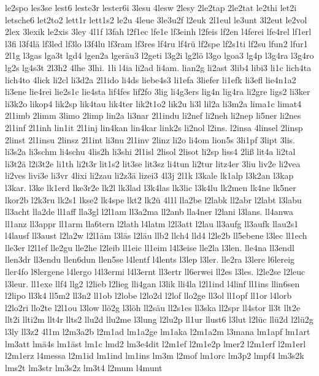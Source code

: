 {le2spo
les3se
lest6
leste3r
lester6i
3lesu
4lesw
2lesy
2le2tap
2le2tat
le2thi
let2i
letsche6
let2to2
lett1r
lett1s2
le2u
4leue
3le3u2f
l2euk
2l1eul
le3unt
3l2eut
le2vol
2lex
3lexik
le2xis
3ley
4l1f
l3fah
l2f1ec
lfe1e
lf3einh
l2feis
lf2en
l4ferei
lfe4rel
lf1erl
l3fi
l3f4lä
lf3led
lf3lo
l3f4lu
lf3ram
lf3res
lf4ru
lf4rü
lf2spe
lf2s1ti
lf2su
lfun2
lfur1
2l1g
l3gas
lga3t
lgd4
lgen2a
lgeräu3
l2geti
l3g2i
lg2lö
l3go
lgoa3
lg4p
l3g4ra
l3g4ro
lg2s
lg4s3t
2l3h2
4lhe
3lhi.
1li
l4ia
li2ad
li4am.
lian2g
li2ast
3lib4
libi3
li1c
lich4ta
lich4to
4lick
li2cl
li3d2a
2l1ido
li4ds
liebe4s3
li1efa
3liefer
li1efk
li3efl
lie4n1a2
li3ene
lie4rei
lie2s1c
lie4sta
lif4fes
lif2fo
3lig
li4g3ers
lig4n
lig4ra
li2gre
ligs2
li3ker
li3k2o
likop4
lik2sp
lik4tau
lik4ter
lik2t1o2
lik2u
li3l
lil2a
li3m2a
lima1c
limat4
2l1imb
2limm
3limo
2limp
lin2a
li3nar
2l1indu
li2nef
li2neh
li2nep
li5ner
li2nes
2l1inf
2l1inh
lin1it
2l1inj
lin4kan
lin4kar
link2s
li2nol
l2ins.
l2insa
4linsel
2linsp
2linst
2l1insu
2linsz
2l1int
li3nu
2l1inv
2linz
li2o
li4om
lion5s
3li1pf
3lipt
3lis.
li3s2a
li3schm
li4schu
4lis2h
li3shi
2l1isl
2lisol
2lisot
li2sp
liss4
2liß
lit4a
li2tal
li3t2ä
l2i3t2e
li1th
li2t3r
lit1s2
lit3se
lit3sz
li4tun
li2tur
litz4er
3liu
liv2e
li2vea
li2ves
livi3e
li3vr
4lixi
li2zau
li2z3ä
lizei3
4l3j
2l1k
l3kale
lk1alp
l3k2an
l3kap
l3kar.
l3ke
lk1erd
lke3r2e
lk2l
lk3lad
l3k4las
lk3lic
l3k4lu
lk2men
lk4ne
lk5ner
lkor2b
l2k3ru
lk2s1
lkse2
lk4spe
lkt2
lk2ü
4l1l
lla2be
l2labk
ll2abr
l2labt
l3labu
ll3acht
lla2de
ll1aff
lla3gl
l2l1am
ll3a2ma
ll2anb
lla4ner
l2lani
l3lans.
ll4anwa
ll1anz
ll3appr
ll1arm
lla6tern
l2lath
l4latm
l2l3att
l2lau
ll3aufg
ll3aufk
llau2s1
l4lausf
ll3aust
l2la2w
l2l1äm
l3läs
l2läu
llb2
llch4
lld4
l2le2b
ll5ebene
l3lec
ll1ech
lle3er
l2l1ef
lle2gu
lle2he
l2leib
ll1eic
ll1eim
l4l3eise
lle2la
l3len.
lle4na
ll3endl
llen3dr
ll3endu
llen6dun
llen5se
l4lentf
l4lents
l3lep
l3ler.
lle2ra
l3lere
l6lereig
ller4fo
l8lergene
l4lergo
l4l3ermi
l4l3ernt
ll3ertr
ll6erwei
ll2es
l3les.
l2le2se
l2leuc
l3leur.
ll1exe
llf4
llg2
l2lieb
l2lieg
lli4gan
l3lik
lli4la
l2l1ind
l4linf
ll1ins
llin6sen
l2lipo
ll3k4
ll5m2
ll3n2
ll1ob
l2lobe
l2lo2d
l2lof
llo2ge
ll3ol
ll1opf
ll1or
l4lorb
l2lo2ri
llo2te
l2l1ou
l3low
llö2g
l3löh
ll2säu
ll2s1es
ll3ska
ll2spr
ll4stor
ll3t
llt2e
llt2i
llti2m
llt4r
llts2
llu2d
llu2me
l3lung
l2lu2p
ll1ur
llust6
l3lut
l2lüc
llü2d
l2lü2g
l3ly
ll3z2
4l1m
l2m3a2b
l2m1ad
lm1a2ge
lm1aka
l2m1a2m
l3mana
lm1apf
lm1art
lm3att
lmä4s
lm1äst
lm1c
lmd2
lm3e4dit
l2m1ef
l2m1e2p
lmer2
l2m1erf
l2m1erl
l2m1erz
l4messa
l2m1id
lm1ind
lm1ins
lm3m
l2mof
lm1orc
lm3p2
lmpf4
lm3s2k
lms2t
lm3str
lm3s2z
lm3t4
l2mum
l4munt
}
